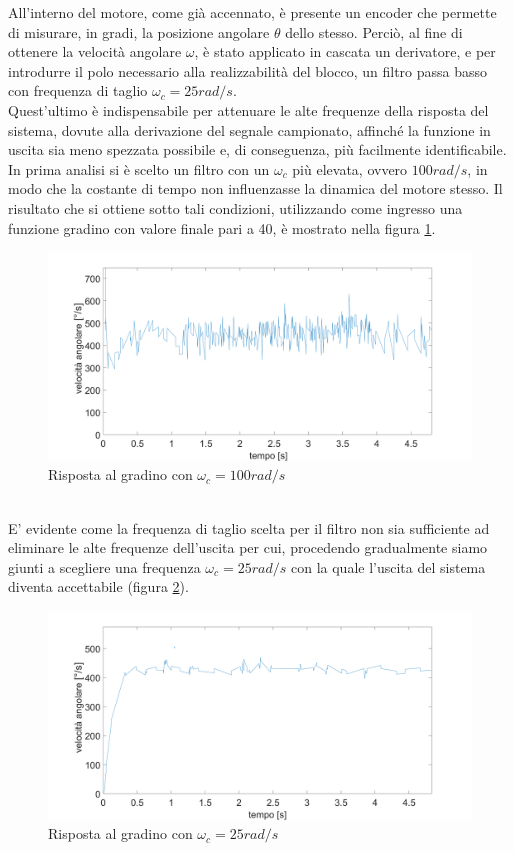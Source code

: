 All'interno del motore, come già accennato, è presente un encoder che permette di misurare, in gradi, la posizione angolare $\theta$ dello stesso.
Perciò, al fine di ottenere la velocità angolare $\omega$, è stato applicato in cascata un derivatore, e per introdurre il polo necessario alla realizzabilità del blocco, un filtro passa basso con frequenza di taglio $\omega_c=25rad/s$. \\Quest'ultimo è indispensabile per attenuare le alte frequenze della risposta del sistema, dovute alla derivazione del segnale campionato, affinché la funzione in uscita sia meno spezzata possibile e, di conseguenza, più facilmente identificabile.\\
In prima analisi si è scelto un filtro con un $\omega_c$ più elevata, ovvero $100rad/s$, in modo che la costante di tempo non influenzasse la dinamica del motore stesso.
Il risultato che si ottiene sotto tali condizioni, utilizzando come ingresso una funzione gradino con valore finale pari a 40, è mostrato nella figura \ref{motore50StepCamp1000Polo100}.
\begin{figure}[ht]
	\centering
	\includegraphics[width=\textwidth]{motore50StepCamp1000Polo100.png}
	\caption{Risposta al gradino con $\omega_c=100rad/s$ }
	\label{motore50StepCamp1000Polo100}
\end{figure}
\\E' evidente come la frequenza di taglio scelta per il filtro non sia sufficiente ad eliminare le alte frequenze dell'uscita per cui, procedendo gradualmente siamo giunti a  scegliere una frequenza $\omega_c = 25rad/s$ con la quale l'uscita del sistema diventa accettabile (figura \ref{motore50StepCamp1000}).
\begin{figure}[ht]
\centering
\includegraphics[width=\textwidth]{motore50StepCamp1000.png}
\caption{Risposta al gradino con $\omega_c=25rad/s$}
\label{motore50StepCamp1000}
\end{figure}
